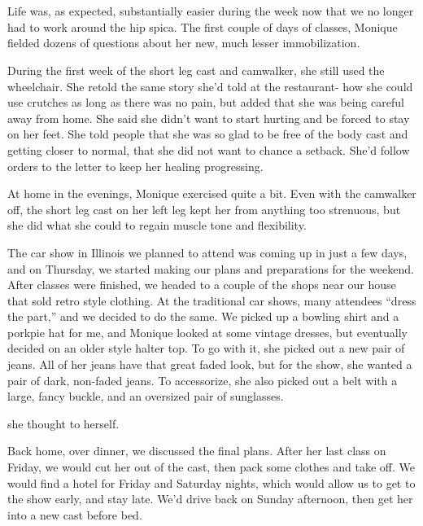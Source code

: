 \chapter{}

Life was, as expected, substantially easier during the week now that we no longer had to work
around the hip spica. The first couple of days of classes, Monique fielded dozens of questions
about her new, much lesser immobilization.

During the first week of the short leg cast and camwalker, she still used the wheelchair. She
retold the same story she'd told at the restaurant- how she could use crutches as long as there
was no pain, but added that she was being careful away from home. She said she didn't want to
start hurting and be forced to stay on her feet. She told people that she was so glad to be free
of the body cast and getting closer to normal, that she did not want to chance a setback. She'd
follow orders to the letter to keep her healing progressing.

At home in the evenings, Monique exercised quite a bit. Even with the camwalker off, the short
leg cast on her left leg kept her from anything too strenuous, but she did what she could to
regain muscle tone and flexibility.

The car show in Illinois we planned to attend was coming up in just a few days, and on
Thursday, we started making our plans and preparations for the weekend. After classes were
finished, we headed to a couple of the shops near our house that sold retro style clothing. At
the traditional car shows, many attendees ``dress the part,'' and we decided to do the same. We
picked up a bowling shirt and a porkpie hat for me, and Monique looked at some vintage dresses,
but eventually decided on an older style halter top. To go with it, she picked out a new pair of
jeans. All of her jeans have that great faded look, but for the show, she wanted a pair of dark,
non-faded jeans. To accessorize, she also picked out a belt with a large, fancy buckle, and an
oversized pair of sunglasses.

 she
thought to herself.

Back home, over dinner, we discussed the final plans. After her last class on Friday, we would
cut her out of the cast, then pack some clothes and take off. We would find a hotel for Friday
and Saturday nights, which would allow us to get to the show early, and stay late. We'd drive
back on Sunday afternoon, then get her into a new cast before bed.


